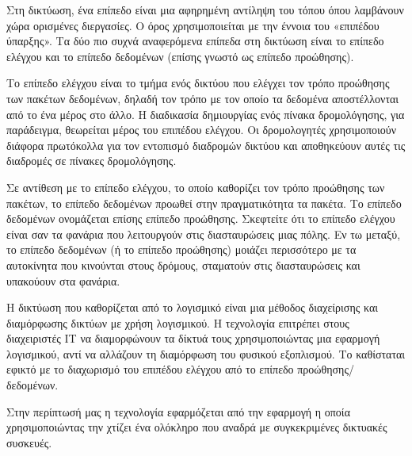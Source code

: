 Στη δικτύωση, ένα επίπεδο είναι μια αφηρημένη αντίληψη του τόπου όπου λαμβάνουν χώρα ορισμένες διεργασίες. 
Ο όρος χρησιμοποιείται με την έννοια του «επιπέδου ύπαρξης». Τα δύο πιο συχνά αναφερόμενα επίπεδα στη δικτύωση είναι το επίπεδο ελέγχου 
και το επίπεδο δεδομένων (επίσης γνωστό ως επίπεδο προώθησης). 

Το επίπεδο ελέγχου είναι το τμήμα ενός δικτύου που ελέγχει τον τρόπο προώθησης των πακέτων δεδομένων, 
δηλαδή τον τρόπο με τον οποίο τα δεδομένα αποστέλλονται από το ένα μέρος στο άλλο. 
Η διαδικασία δημιουργίας ενός πίνακα δρομολόγησης, για παράδειγμα, θεωρείται μέρος του επιπέδου ελέγχου. 
Οι δρομολογητές χρησιμοποιούν διάφορα πρωτόκολλα για τον εντοπισμό διαδρομών δικτύου και αποθηκεύουν αυτές τις διαδρομές σε πίνακες δρομολόγησης.

Σε αντίθεση με το επίπεδο ελέγχου, το οποίο καθορίζει τον τρόπο προώθησης των πακέτων, το επίπεδο δεδομένων προωθεί στην πραγματικότητα τα πακέτα. 
Το επίπεδο δεδομένων ονομάζεται επίσης επίπεδο προώθησης. Σκεφτείτε ότι το επίπεδο ελέγχου είναι σαν τα φανάρια που λειτουργούν στις διασταυρώσεις μιας πόλης. 
Εν τω μεταξύ, το επίπεδο δεδομένων (ή το επίπεδο προώθησης) μοιάζει περισσότερο με τα αυτοκίνητα που κινούνται στους δρόμους, 
σταματούν στις διασταυρώσεις και υπακούουν στα φανάρια.


Η δικτύωση που καθορίζεται από το λογισμικό  είναι μια μέθοδος διαχείρισης και διαμόρφωσης δικτύων με χρήση λογισμικού. 
Η τεχνολογία  επιτρέπει στους διαχειριστές IT να διαμορφώνουν τα δίκτυά τους χρησιμοποιώντας μια εφαρμογή λογισμικού, 
αντί να αλλάζουν τη διαμόρφωση του φυσικού εξοπλισμού. Το  καθίσταται εφικτό με το διαχωρισμό του επιπέδου ελέγχου από το επίπεδο προώθησης/δεδομένων. 

Στην περίπτωσή μας η τεχνολογία  εφαρμόζεται από την  εφαρμογή η οποία χρησιμοποιώντας την  χτίζει ένα ολόκληρο
 που αναδρά με συγκεκριμένες δικτυακές συσκευές. 












